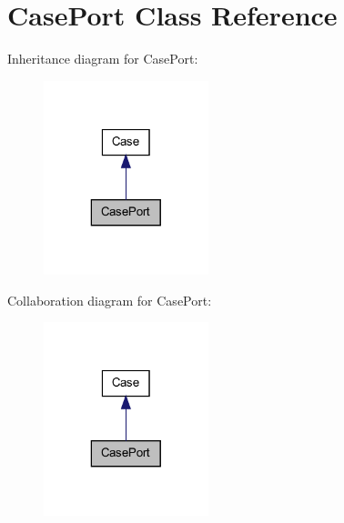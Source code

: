 \hypertarget{class_case_port}{
\section{CasePort Class Reference}
\label{class_case_port}
}


Inheritance diagram for CasePort:
\nopagebreak
\begin{figure}[H]
\begin{center}
\leavevmode
\includegraphics[width=136pt]{class_case_port__inherit__graph}
\end{center}
\end{figure}


Collaboration diagram for CasePort:
\nopagebreak
\begin{figure}[H]
\begin{center}
\leavevmode
\includegraphics[width=136pt]{class_case_port__coll__graph}
\end{center}
\end{figure}
